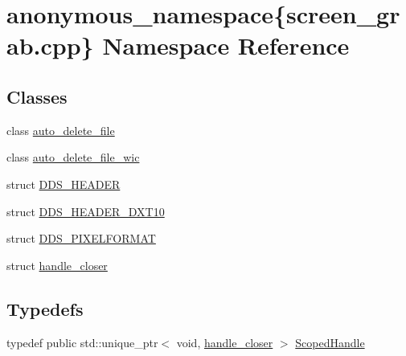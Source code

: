 \hypertarget{namespaceanonymous__namespace_02screen__grab_8cpp_03}{}\section{anonymous\+\_\+namespace\{screen\+\_\+grab.\+cpp\} Namespace Reference}
\label{namespaceanonymous__namespace_02screen__grab_8cpp_03}
\subsection*{Classes}
\begin{DoxyCompactItemize}
\item 
class \mbox{\hyperlink{classanonymous__namespace_02screen__grab_8cpp_03_1_1auto__delete__file}{auto\+\_\+delete\+\_\+file}}
\item 
class \mbox{\hyperlink{classanonymous__namespace_02screen__grab_8cpp_03_1_1auto__delete__file__wic}{auto\+\_\+delete\+\_\+file\+\_\+wic}}
\item 
struct \mbox{\hyperlink{structanonymous__namespace_02screen__grab_8cpp_03_1_1_d_d_s___h_e_a_d_e_r}{D\+D\+S\+\_\+\+H\+E\+A\+D\+ER}}
\item 
struct \mbox{\hyperlink{structanonymous__namespace_02screen__grab_8cpp_03_1_1_d_d_s___h_e_a_d_e_r___d_x_t10}{D\+D\+S\+\_\+\+H\+E\+A\+D\+E\+R\+\_\+\+D\+X\+T10}}
\item 
struct \mbox{\hyperlink{structanonymous__namespace_02screen__grab_8cpp_03_1_1_d_d_s___p_i_x_e_l_f_o_r_m_a_t}{D\+D\+S\+\_\+\+P\+I\+X\+E\+L\+F\+O\+R\+M\+AT}}
\item 
struct \mbox{\hyperlink{structanonymous__namespace_02screen__grab_8cpp_03_1_1handle__closer}{handle\+\_\+closer}}
\end{DoxyCompactItemize}
\subsection*{Typedefs}
\begin{DoxyCompactItemize}
\item 
typedef public std\+::unique\+\_\+ptr$<$ void, \mbox{\hyperlink{structanonymous__namespace_02screen__grab_8cpp_03_1_1handle__closer}{handle\+\_\+closer}} $>$ \mbox{\hyperlink{namespaceanonymous__namespace_02screen__grab_8cpp_03_acdf0b72bf6ce17c9cc2dfb41f21e4706}{Scoped\+Handle}}
\end{DoxyCompactItemize}
